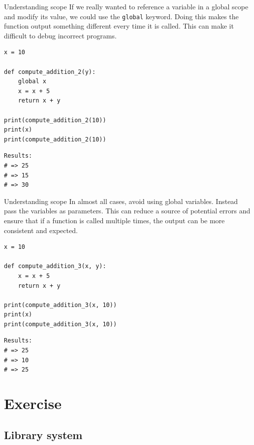 \documentclass[10pt]{beamer}
\begin{document}
\begin{frame}[label={sec:org1094100},fragile]{Understanding scope}
 If we really wanted to reference a variable in a global scope and modify its value,
we could use the \texttt{global} keyword. Doing this makes the
function output something different every time it is called. This can make it
difficult to debug incorrect programs.

\begin{verbatim}
x = 10

def compute_addition_2(y):
    global x
    x = x + 5
    return x + y

print(compute_addition_2(10))
print(x)
print(compute_addition_2(10))
\end{verbatim}

\begin{verbatim}
Results: 
# => 25
# => 15
# => 30
\end{verbatim}
\end{frame}

\begin{frame}[label={sec:org7054f62},fragile]{Understanding scope}
 In almost all cases, avoid using global variables. Instead pass the variables as
parameters. This can reduce a source of potential errors and ensure that if a
function is called multiple times, the output can be more consistent and expected.

\begin{verbatim}
x = 10

def compute_addition_3(x, y):
    x = x + 5
    return x + y

print(compute_addition_3(x, 10))
print(x)
print(compute_addition_3(x, 10))
\end{verbatim}

\begin{verbatim}
Results: 
# => 25
# => 10
# => 25
\end{verbatim}
\end{frame}

\section{Exercise}
\label{sec:orgebe08ef}

\subsection{Library system}
\label{sec:org4a40d33}
\end{document}
